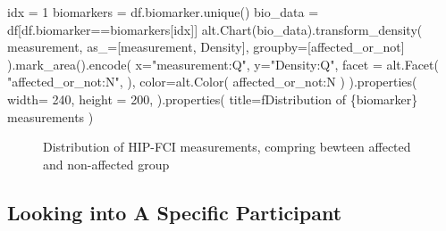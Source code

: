 \documentclass[
  letterpaper,
  DIV=11,
  numbers=noendperiod]{scrreprt}
\newenvironment{Shaded}{\begin{snugshade}}{\end{snugshade}}
\newcommand{\DecValTok}[1]{\textcolor[rgb]{0.68,0.00,0.00}{#1}}
\newcommand{\NormalTok}[1]{\textcolor[rgb]{0.00,0.23,0.31}{#1}}
\newcommand{\OperatorTok}[1]{\textcolor[rgb]{0.37,0.37,0.37}{#1}}
\newcommand{\SpecialCharTok}[1]{\textcolor[rgb]{0.37,0.37,0.37}{#1}}
\newcommand{\SpecialStringTok}[1]{\textcolor[rgb]{0.13,0.47,0.30}{#1}}
\newcommand{\StringTok}[1]{\textcolor[rgb]{0.13,0.47,0.30}{#1}}
\begin{document}
\begin{Shaded}
\begin{Highlighting}[]
\NormalTok{idx }\OperatorTok{=} \DecValTok{1}
\NormalTok{biomarkers }\OperatorTok{=}\NormalTok{ df.biomarker.unique()}
\NormalTok{bio\_data }\OperatorTok{=}\NormalTok{ df[df.biomarker}\OperatorTok{==}\NormalTok{biomarkers[idx]]}
\NormalTok{alt.Chart(bio\_data).transform\_density(}
    \StringTok{\textquotesingle{}measurement\textquotesingle{}}\NormalTok{,}
\NormalTok{    as\_}\OperatorTok{=}\NormalTok{[}\StringTok{\textquotesingle{}measurement\textquotesingle{}}\NormalTok{, }\StringTok{\textquotesingle{}Density\textquotesingle{}}\NormalTok{],}
\NormalTok{    groupby}\OperatorTok{=}\NormalTok{[}\StringTok{\textquotesingle{}affected\_or\_not\textquotesingle{}}\NormalTok{]}
\NormalTok{).mark\_area().encode(}
\NormalTok{    x}\OperatorTok{=}\StringTok{"measurement:Q"}\NormalTok{,}
\NormalTok{    y}\OperatorTok{=}\StringTok{"Density:Q"}\NormalTok{,}
\NormalTok{    facet }\OperatorTok{=}\NormalTok{ alt.Facet(}
        \StringTok{"affected\_or\_not:N"}\NormalTok{,}
\NormalTok{    ),}
\NormalTok{    color}\OperatorTok{=}\NormalTok{alt.Color(}
        \StringTok{\textquotesingle{}affected\_or\_not:N\textquotesingle{}}
\NormalTok{    )}
\NormalTok{).properties(}
\NormalTok{    width}\OperatorTok{=} \DecValTok{240}\NormalTok{,}
\NormalTok{    height }\OperatorTok{=} \DecValTok{200}\NormalTok{,}
\NormalTok{).properties(}
\NormalTok{    title}\OperatorTok{=}\SpecialStringTok{f\textquotesingle{}Distribution of }\SpecialCharTok{\{}\NormalTok{biomarker}\SpecialCharTok{\}}\SpecialStringTok{ measurements\textquotesingle{}}
\NormalTok{)}
\end{Highlighting}
\end{Shaded}

\begin{figure}[H]


\caption{\label{fig-dist-specific-biomarker-vals}Distribution of HIP-FCI
measurements, compring bewteen affected and non-affected group}

\end{figure}%

\subsection{Looking into A Specific
Participant}\label{looking-into-a-specific-participant}
\end{document}
